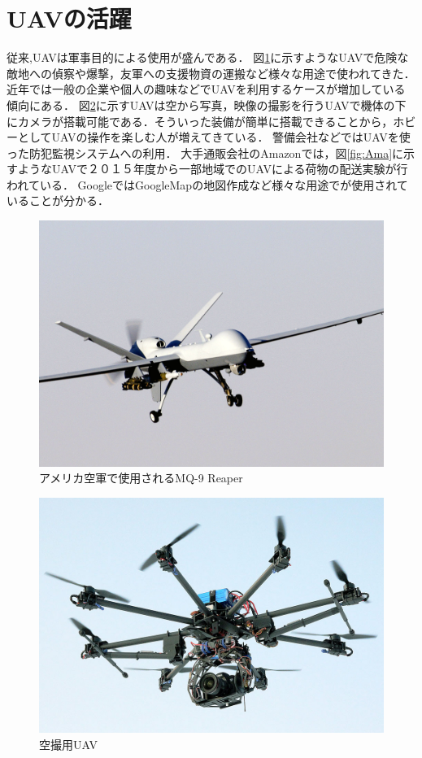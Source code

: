 \documentclass[12pt,oneside]{sotsuken_paper}
\begin{document}
\section{UAVの活躍}
従来,UAVは軍事目的による使用が盛んである．
図\ref{fig:hara}に示すようなUAVで危険な敵地への偵察や爆撃，友軍への支援物資の運搬など様々な用途で使われてきた．
近年では一般の企業や個人の趣味などでUAVを利用するケースが増加している傾向にある．
図\ref{fig:multi}に示すUAVは空から写真，映像の撮影を行うUAVで機体の下にカメラが搭載可能である．そういった装備が簡単に搭載できることから，ホビーとしてUAVの操作を楽しむ人が増えてきている．
警備会社などではUAVを使った防犯監視システムへの利用．
大手通販会社のAmazonでは，図\ref{fig:Ama}に示すようなUAVで２０１５年度から一部地域でのUAVによる荷物の配送実験が行われている．
GoogleではGoogleMapの地図作成など様々な用途でが使用されていることが分かる．


\begin{figure}[H]
\begin{center}
\includegraphics[width=120mm]{img/hara.jpg}
\end{center}
\caption{アメリカ空軍で使用されるMQ-9 Reaper}
\label{fig:hara}
\end{figure}

\begin{figure}[H]
\begin{center}
\includegraphics[width=120mm]{img/multi.jpg}
\end{center}
\caption{空撮用UAV}
\label{fig:multi}
\end{figure}
\end{document}

